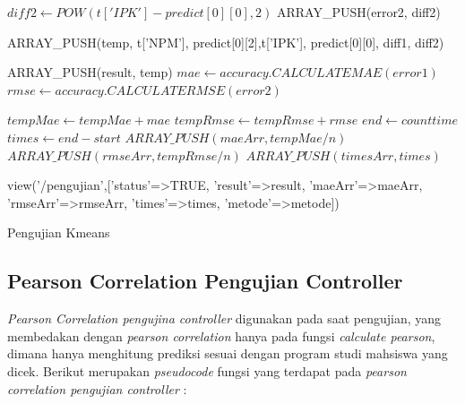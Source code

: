 \begin{enumerate}
\begin{algorithm}[H]
\begin{algorithmic}[1]
                                        \State $diff2 \gets POW(t['IPK'] - predict[0][0],2)$
                                        \State ARRAY\_PUSH(error2, diff2)
                                        
                                        \State ARRAY\_PUSH(temp, t['NPM'], predict[0][2],t['IPK'], predict[0][0], diff1, diff2)
                                        
                                        \State ARRAY\_PUSH(result, temp)
                                    \EndIf
                                \EndIf
                            \EndFor
                                \State $mae \gets accuracy.CALCULATEMAE(error1)$
                                \State $rmse \gets accuracy.CALCULATERMSE(error2)$
                                
                                \State $tempMae \gets tempMae + mae$
                                \State $tempRmse \gets tempRmse + rmse$
                        \EndFor
                        \State $end \gets count time$
                        \State $times \gets end - start$
                        \State $ARRAY\_PUSH(maeArr, tempMae/n)$
                        \State $ARRAY\_PUSH(rmseArr, tempRmse/n)$
                        \State $ARRAY\_PUSH(timesArr, times)$
                   \EndFor
                   
                   \State \Return view('/pengujian',['status'=>TRUE, 'result'=>result, 'maeArr'=>maeArr, 'rmseArr'=>rmseArr, 'times'=>times, 'metode'=>metode])
                \EndProcedure
            \end{algorithmic} 
            \caption{Pengujian Kmeans}
            \label{alg:pengujianKmeans}
        \end{algorithm}

\end{enumerate}

\subsection{Pearson Correlation Pengujian Controller}
\label{subsec:pearson pengujian}

\textit{Pearson Correlation pengujina controller} digunakan pada saat pengujian, yang membedakan dengan \textit{pearson correlation} hanya pada fungsi \textit{calculate pearson}, dimana hanya menghitung prediksi sesuai dengan program studi mahsiswa yang dicek. Berikut merupakan \textit{pseudocode} fungsi yang terdapat pada \textit{pearson correlation pengujian controller} :

